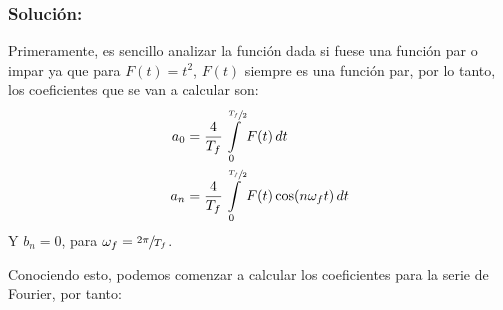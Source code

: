 \begin{multicols}{2}
\subsubsection*{Solución:}

Primeramente, es sencillo analizar la función dada si fuese una función par o impar ya que para $F(t) = t^{2}$, $F(t)$ siempre es una función par, por lo tanto, los coeficientes que se van a calcular son:
\begin{align}
    a_0 &= \frac{4}{T_f} \int\limits_{0}^{\sfrac{T_{f}}{2}} F(t) \,dt \label{pro2:eq1}\\
    a_n &= \frac{4}{T_f} \int\limits_{0}^{\sfrac{T_{f}}{2}} F(t) \cos(n \omega_f t) \,dt\label{pro2:eq2}
\end{align}
Y $b_n = 0$, para $\omega_f = \sfrac{2 \pi}{T_f}$.

Conociendo esto, podemos comenzar a calcular los coeficientes para la serie de Fourier, por tanto:


\end{multicols}
